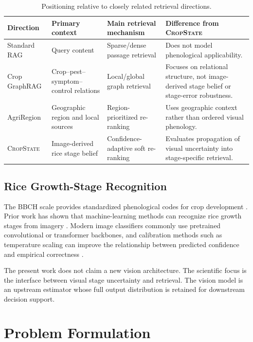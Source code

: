\documentclass[conference]{IEEEtran}
\newcommand{\method}{\textsc{CropState}}
\begin{document}
\begin{table}[t]
\caption{Positioning relative to closely related retrieval directions.}
\label{tab:positioning}
\centering
\footnotesize
\begin{tabular}{p{}p{}p{}p{}}
\toprule
Direction & Primary context & Main retrieval mechanism & Difference from \method \\
\midrule
Standard RAG & Query content & Sparse/dense passage retrieval & Does not model phenological applicability. \\
Crop GraphRAG & Crop--pest--symptom--control relations & Local/global graph retrieval & Focuses on relational structure, not image-derived stage belief or stage-error robustness. \\
AgriRegion & Geographic region and local sources & Region-prioritized re-ranking & Uses geographic context rather than ordered visual phenology. \\
\method & Image-derived rice stage belief & Confidence-adaptive soft re-ranking & Evaluates propagation of visual uncertainty into stage-specific retrieval. \\
\bottomrule
\end{tabular}
\end{table}

\subsection{Rice Growth-Stage Recognition}
The BBCH scale provides standardized phenological codes for crop development \cite{meier2001bbch,lancashire1991uniform}. Prior work has shown that machine-learning methods can recognize rice growth stages from imagery \cite{tan2022rice}. Modern image classifiers commonly use pretrained convolutional or transformer backbones, and calibration methods such as temperature scaling can improve the relationship between predicted confidence and empirical correctness \cite{he2016resnet,tan2019efficientnet,guo2017calibration}.

The present work does not claim a new vision architecture. The scientific focus is the interface between visual stage uncertainty and retrieval. The vision model is an upstream estimator whose full output distribution is retained for downstream decision support.

\section{Problem Formulation}
\end{document}
